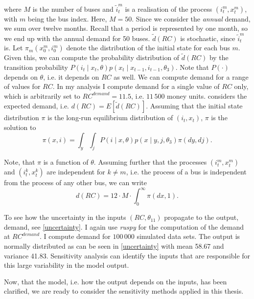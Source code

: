 \noindent where $M$ is the number of buses and ${\tilde{i}}_t^m$ is a realisation of the process $(i_t^m, x_t^m)$, with $m$ being the bus index. Here, $M=50$. Since we consider the \textit{annual} demand, we sum over twelve months. Recall that a period is represented by one month, so we end up with the annual demand for 50 buses. $\tilde{d}(RC)$ is stochastic, since ${\tilde{i}}_t^m$ is. Let $\pi_m(x_0^m, i_0^m)$ denote the distribution of the initial state for each bus $m$. Given this, we can compute the probability distribution of $\tilde{d}(RC) $ by the transition probability $P(i_t \mid x_t, \theta)p(x_t \mid x_{t-1}, i_{t-1}, \theta_3) $. Note that $P(\cdot)$ depends on $\theta$, i.e. it depends on $RC$ as well. We can compute demand for a range of values for $RC$. In my analysis I compute demand for a single value of $RC$ only, which is arbitrarily set to $RC^{demand}=11.5$, i.e. $11\,500$ money units. \citet{R87} considers the expected demand, i.e. $d(RC)=E[\tilde{d}(RC)]$. Assuming that the initial state distribution $\pi$ is the long-run equilibrium distribution of $(i_t, x_t)$, $\pi$ is the solution to
\begin{equation*}
\pi(x, i)=\int_y \int_j P(i \mid x, \theta) p(x \mid y, j, \theta_3) \pi(dy, dj).
\end{equation*}

Note, that $\pi$ is a function of $\theta$. Assuming further that the processes $ (i_t^m, x_t^m)$ and $(i_t^k, x_t^k)$ are independent for $k \neq m$, i.e. the process of a bus is independent from the process of any other bus, we can write
\begin{equation*}
d(RC)=12 \cdot M \cdot \int_0^{\infty} \pi(dx, 1).
\end{equation*}

To see how the uncertainty in the inputs $(RC, \theta_{11})$ propagate to the output, demand, see \cref{uncertainty}. I again use \textit{ruspy} for the computation of the demand at $RC^{demand}$. I compute demand for $100\,000$ simulated data sets. The output is normally distributed as can be seen in \cref{uncertainty} with mean 58.67 and variance 41.83. Sensitivity analysis can identify the inputs that are responsible for this large variability in the model output.

Now, that the model, i.e. how the output depends on the inputs, has been clarified, we are ready to consider the sensitivity methods applied in this thesis.

